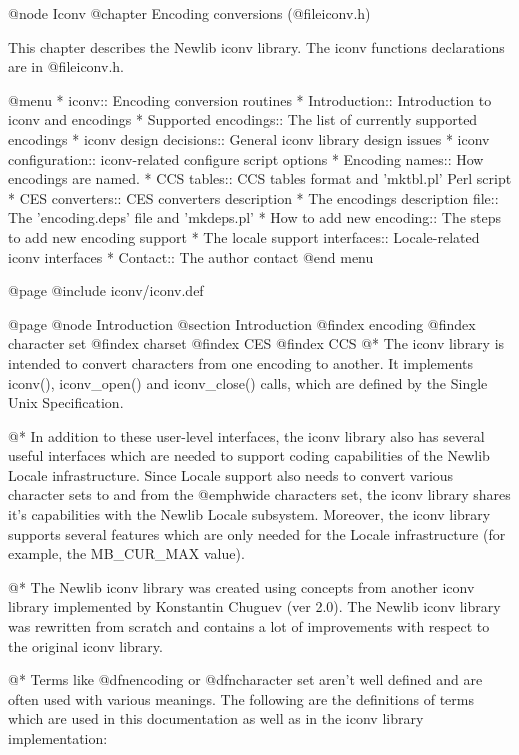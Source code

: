 @node Iconv
@chapter Encoding conversions (@file{iconv.h})

This chapter describes the Newlib iconv library.
The iconv functions declarations are in
@file{iconv.h}.

@menu
* iconv::                           Encoding conversion routines
* Introduction::                    Introduction to iconv and encodings
* Supported encodings::             The list of currently supported encodings
* iconv design decisions::          General iconv library design issues
* iconv configuration::             iconv-related configure script options
* Encoding names::                  How encodings are named.
* CCS tables::                      CCS tables format and 'mktbl.pl' Perl script
* CES converters::                  CES converters description
* The encodings description file::  The 'encoding.deps' file and 'mkdeps.pl'
* How to add new encoding::         The steps to add new encoding support
* The locale support interfaces::   Locale-related iconv interfaces
* Contact::                         The author contact
@end menu

@page
@include iconv/iconv.def

@page
@node Introduction
@section Introduction
@findex encoding
@findex character set
@findex charset
@findex CES
@findex CCS
@*
The iconv library is intended to convert characters from one encoding to
another. It implements iconv(), iconv_open() and iconv_close()
calls, which are defined by the Single Unix Specification.

@*
In addition to these user-level interfaces, the iconv library also has
several useful interfaces which are needed to support coding
capabilities of the Newlib Locale infrastructure.  Since Locale 
support also needs to
convert various character sets to and from the @emph{wide characters
set}, the iconv library shares it's capabilities with the Newlib Locale
subsystem. Moreover, the iconv library supports several features which are
only needed for the Locale infrastructure (for example, the MB_CUR_MAX value).

@*
The Newlib iconv library was created using concepts from another iconv
library implemented by Konstantin Chuguev (ver 2.0). The Newlib iconv library
was rewritten from scratch and contains a lot of improvements with respect to
the original iconv library. 

@*
Terms like @dfn{encoding} or @dfn{character set} aren't well defined and
are often used with various meanings. The following are the definitions of terms
which are used in this documentation as well as in the iconv library
implementation:

